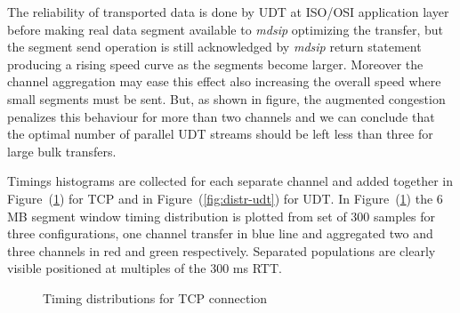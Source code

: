 \documentclass[10pt,a4paper]{article}
\begin{document}
The reliability of transported data is done by UDT at ISO/OSI application layer before making real data segment available to \emph{mdsip} optimizing the transfer, but the segment send operation is still acknowledged by \emph{mdsip} return statement producing a rising speed curve as the segments become larger.
Moreover the channel aggregation may ease this effect also increasing the overall speed where small segments must be sent.
But, as shown in figure, the augmented congestion penalizes this behaviour for more than two channels and we can conclude that the optimal number of parallel UDT streams should be left less than three for large bulk transfers.

Timings histograms are collected for each separate channel and added together in Figure~(\ref{fig:distr-tcp}) for TCP and in Figure~(\ref{fig:distr-udt}) for UDT.
In Figure~(\ref{fig:distr-tcp}) the 6 MB segment window timing distribution is plotted from set of 300 samples for three configurations, one channel transfer in blue line and aggregated two and three channels in red and green respectively.
Separated populations are clearly visible positioned at multiples of the 300 ms RTT.
~
\begin{figure}[ht]
\centerline{
}
\caption[]
{ Timing distributions for TCP connection }
\label{fig:distr-tcp}
\end{figure}
\end{document}

